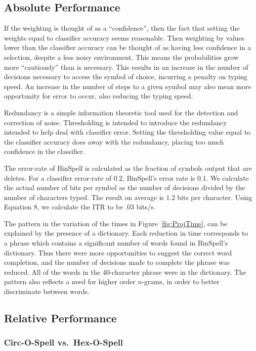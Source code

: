 \documentclass[12pt,titlepage]{article}
\begin{document}
\subsection{Absolute Performance}

If the weighting is thought of as a ``confidence'', then the fact that setting the weights equal to 
classifier accuracy seems reasonable.  Then weighting by values lower than the classifier 
accuracy can be thought of as having less confidence in a selection, despite a less noisy 
environment.  This means the probabilities grow more ``cautiously'' than is necessary.  This 
results in an increase in the number of decisions necessary to access the symbol of choice, 
incurring a penalty on typing speed.  An increase in the number of steps to a given symbol may 
also mean more opportunity for error to occur, also reducing the typing speed.

Redundancy is a simple information theoretic tool used for the detection and correction of noise.  Thresholding is intended to introduce the redundancy intended to help deal with classifier error.  Setting the thresholding value equal to the classifier accuracy does away with the redundancy, placing too much confidence in the classifier.

The error-rate of BinSpell is calculated as the fraction of symbols output that are deletes.  For a classifier error-rate of $0.2$, BinSpell's error rate is $0.1$.  We calculate the actual number of bits per symbol as the number of decisions divided by the number of characters typed.  The result on average is $1.2$ bits per character.  Using Equation 8, we calculate the ITR to be $.03$ bits/s.  

The pattern in the variation of the times in Figure~\ref{fig:ProjTime}, can be explained by 
the presence of a dictionary.  Each reduction in time corresponds to a phrase 
which contains a significant number of words found in BinSpell's dictionary.  Thus there were 
more opportunities to suggest the correct word completion, and the number of decisions made 
to complete the phrase was reduced.  All of the words in the 40-character phrase were in the 
dictionary.  The pattern also reflects a need for higher order $n$-grams, in order to better 
discriminate between words.

\subsection{Relative Performance}

\subsubsection{Circ-O-Spell vs.\ Hex-O-Spell}
\end{document}

